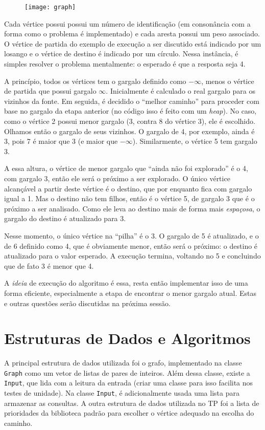 \documentclass{article}
\def\code#1{\texttt{#1}}
\begin{document}
\begin{figure}[H]
	\texttt{[image: graph]}
	\centering
\end{figure}

Cada vértice possui possui um número de identificação (em consonância com a forma como o problema é implementado) e cada aresta possui um peso associado. O vértice de partida do exemplo de execução a ser discutido está indicado por um losango e o vértice de destino é indicado por um círculo. Nessa instância, é simples resolver o problema mentalmente: o esperado é que a resposta seja 4.

A princípio, todos os vértices tem o gargalo definido como \( -\infty \), menos o vértice de partida que possui gargalo \( \infty \). Inicialmente é calculado o real gargalo para os vizinhos da fonte. Em seguida, é decidido o ``melhor caminho'' para proceder com base no gargalo da etapa anterior (no código isso é feito com um \textit{heap}). No caso, como o vértice 2 possui menor gargalo (3, contra 8 do vértice 3), ele é escolhido. Olhamos então o gargalo de seus vizinhos. O gargalo de 4, por exemplo, ainda é 3, pois 7 é maior que 3 (e maior que \( -\infty \)). Similarmente, o vértice 5 tem gargalo 3.

A essa altura, o vértice de menor gargalo que ``ainda não foi explorado'' é o 4, com gargalo 3, então ele será o próximo a ser explorado. O único vértice alcançável a partir deste vértice é o destino, que por enquanto fica com gargalo igual a 1. Mas o destino não tem filhos, então é o vértice 5, de gargalo 3 que é o próximo a ser analisado. Como ele leva ao destino mais de forma mais \textit{espaçosa}, o gargalo do destino é atualizado para 3.

Nesse momento, o único vértice na ``pilha'' é o 3. O gargalo de 5 é atualizado, e o de 6 definido como 4, que é obviamente menor, então será o próximo: o destino é atualizado para o valor esperado. A execução termina, voltando no 5 e concluindo que de fato 3 é menor que 4.

A \textit{ideia} de execução do algoritmo é essa, resta então implementar isso de uma forma eficiente, especialmente a etapa de encontrar o menor gargalo atual. Estas e outras questões serão discutidas na próxima sessão.

\section{Estruturas de Dados e Algoritmos}

A principal estrutura de dados utilizada foi o grafo, implementado na classe \code{Graph} como um vetor de listas de pares de inteiros. Além dessa classe, existe a \code{Input}, que lida com a leitura da entrada (criar uma classe para isso facilita nos testes de unidade). Na classe \code{Input}, é adicionalmente usada uma lista para armazenar as consultas. A outra estrutura de dados utilizada no TP foi a lista de prioridades da biblioteca padrão para escolher o vértice adequado na escolha do caminho.
\end{document}
